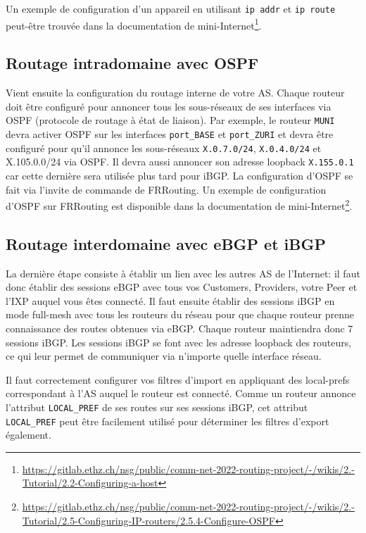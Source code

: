 \documentclass[a4paper, 11pt]{article}
\begin{document}
Un exemple de configuration d'un appareil en utilisant
\texttt{ip addr} et \texttt{ip route} peut-être trouvée dans la documentation
de mini-Internet\footnote{\url{https://gitlab.ethz.ch/nsg/public/comm-net-2022-routing-project/-/wikis/2.-Tutorial/2.2-Configuring-a-host}}.

\subsection{Routage intradomaine avec OSPF}

Vient ensuite la configuration du routage interne de votre AS.
Chaque routeur doit être configuré pour annoncer tous
les sous-réseaux de ses interfaces
via OSPF (protocole de routage à état de liaison).
Par exemple, le routeur \texttt{MUNI} devra activer
OSPF sur les interfaces \texttt{port\_BASE} et \texttt{port\_ZURI}
et devra être configuré
pour qu'il annonce les sous-réseaux \texttt{X.0.7.0/24},
\texttt{X.0.4.0/24} et X.105.0.0/24 via OSPF.
Il devra aussi annoncer son adresse loopback \texttt{X.155.0.1}
car cette dernière sera utilisée plus tard pour iBGP.
La configuration d'OSPF se fait via l'invite de commande de
FRRouting. Un exemple de configuration d'OSPF sur FRRouting
est disponible dans la documentation de
mini-Internet\footnote{\url{https://gitlab.ethz.ch/nsg/public/comm-net-2022-routing-project/-/wikis/2.-Tutorial/2.5-Configuring-IP-routers/2.5.4-Configure-OSPF}}.


\subsection{Routage interdomaine avec eBGP et iBGP}

La dernière étape consiste à établir un lien avec les autres AS
de l'Internet: il faut donc établir des sessions eBGP avec tous vos
Customers, Providers, votre Peer et l'IXP auquel vous êtes connecté.
Il faut ensuite établir des sessions iBGP en mode full-mesh avec 
tous les routeurs du réseau pour que chaque routeur prenne connaissance
des routes obtenues via eBGP. Chaque routeur maintiendra donc
7 sessions iBGP. Les sessions iBGP se font avec les adresse loopback
des routeurs, ce qui leur permet de communiquer via n'importe quelle
interface réseau.

Il faut correctement configurer vos filtres d'import en appliquant
des local-prefs correspondant à l'AS auquel le routeur est connecté.
Comme un routeur annonce l'attribut \texttt{LOCAL\_PREF} de ses routes
sur ses sessions iBGP, cet attribut \texttt{LOCAL\_PREF} peut être
facilement utilisé pour déterminer les filtres d'export également.
\end{document}
